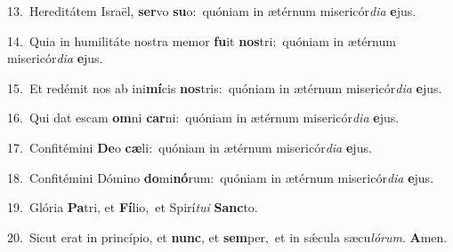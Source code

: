{\numbfont\textcolor{\numbcolor}{13.}}~Hereditátem Israël, \textbf{ser}\-vo \textbf{su}\-o:~\star quóniam in ætérnum misericór\-\textit{di}\-\textit{a} \textbf{e}\-jus.\par
{\numbfont\textcolor{\numbcolor}{14.}}~Quia in humilitáte nostra memor \textbf{fu}\-it \textbf{nos}\-tri:~\star quóniam in ætérnum misericór\-\textit{di}\-\textit{a} \textbf{e}\-jus.\par
{\numbfont\textcolor{\numbcolor}{15.}}~Et redémit nos ab ini\-\textbf{mí}\-cis \textbf{nos}\-tris:~\star quóniam in ætérnum misericór\-\textit{di}\-\textit{a} \textbf{e}\-jus.\par
{\numbfont\textcolor{\numbcolor}{16.}}~Qui dat escam \textbf{om}\-ni \textbf{car}\-ni:~\star quóniam in ætérnum misericór\-\textit{di}\-\textit{a} \textbf{e}\-jus.\par
{\numbfont\textcolor{\numbcolor}{17.}}~Confitémini \textbf{De}\-o \textbf{cæ}\-li:~\star quóniam in ætérnum misericór\-\textit{di}\-\textit{a} \textbf{e}\-jus.\par
{\numbfont\textcolor{\numbcolor}{18.}}~Confitémini Dómino \textbf{do}\-mi\-\textbf{nó}\-rum:~\star quóniam in ætérnum misericór\-\textit{di}\-\textit{a} \textbf{e}\-jus.\par
{\numbfont\textcolor{\numbcolor}{19.}}~Glória \textbf{Pa}\-tri, et \textbf{Fí}\-lio,~\star et Spirí\-\textit{tu}\-\textit{i} \textbf{Sanc}\-to.\par
{\numbfont\textcolor{\numbcolor}{20.}}~Sicut erat in princípio, et \textbf{nunc}\-, et \textbf{sem}\-per,~\star et in sǽcula sæcu\-\textit{ló}\-\textit{rum}. \textbf{A}\-men.\par
